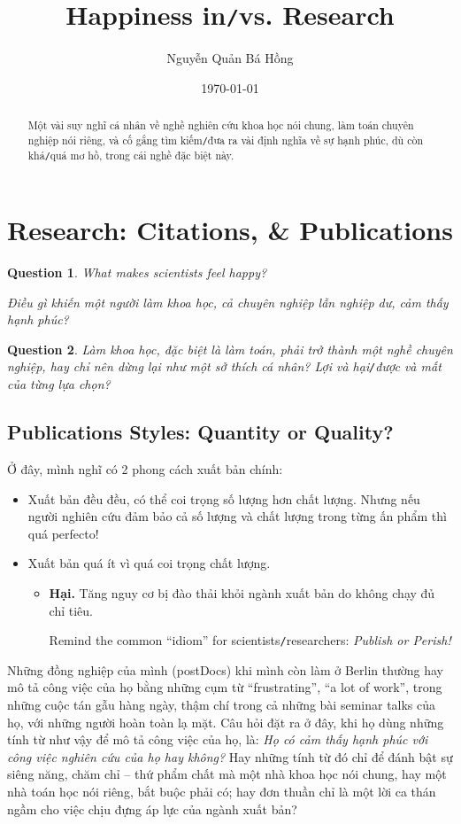 \documentclass{article}
\title{Happiness in\texttt{/}vs. Research}
\author{Nguyễn Quản Bá Hồng}
\date{\today}
\numberwithin{equation}{section}
\newtheorem{ques}{Question}[section]
\begin{document}
\maketitle
\begin{abstract}
	Một vài suy nghĩ cá nhân về nghề nghiên cứu khoa học nói chung, làm toán chuyên nghiệp nói riêng, và cố gắng tìm kiếm\texttt{/}đưa ra vài định nghĩa về sự hạnh phúc, dù còn khá\texttt{/}quá mơ hồ, trong cái nghề đặc biệt này.
\end{abstract}
\tableofcontents


\section{Research: Citations, \& Publications}
\begin{ques}
	What makes scientists feel happy?
	
	Điều gì khiến một người làm khoa học, cả chuyên nghiệp lẫn nghiệp dư, cảm thấy hạnh phúc?
\end{ques}

\begin{ques}
	Làm khoa học, đặc biệt là làm toán, phải trở thành một nghề chuyên nghiệp, hay chỉ nên dừng lại như một sở thích cá nhân? Lợi và hại\texttt{/}được và mất của từng lựa chọn?
\end{ques}

\subsection{Publications Styles: Quantity or Quality?}
Ở đây, mình nghĩ có 2 phong cách xuất bản chính:
\begin{itemize}
	\item Xuất bản đều đều, có thể coi trọng số lượng hơn chất lượng. Nhưng nếu người nghiên cứu đảm bảo cả số lượng và chất lượng trong từng ấn phẩm thì quá perfecto!
	\item Xuất bản quá ít vì quá coi trọng chất lượng.
	\begin{itemize}
		\item \textbf{Hại.} Tăng nguy cơ bị đào thải khỏi ngành xuất bản do không chạy đủ chỉ tiêu.
		
		Remind the common ``idiom'' for scientists\texttt{/}researchers: \textit{Publish or Perish!}
	\end{itemize}
\end{itemize}
Những đồng nghiệp của mình (postDocs) khi mình còn làm ở Berlin thường hay mô tả công việc của họ bằng những cụm từ ``frustrating'', ``a lot of work'', trong những cuộc tán gẫu hàng ngày, thậm chí trong cả những bài seminar talks của họ, với những người hoàn toàn lạ mặt. Câu hỏi đặt ra ở đây, khi họ dùng những tính từ như vậy để mô tả công việc của họ, là: \textit{Họ có cảm thấy hạnh phúc với công việc nghiên cứu của họ hay không?} Hay những tính từ đó chỉ để đánh bật sự siêng năng, chăm chỉ -- thứ phẩm chất mà một nhà khoa học nói chung, hay một nhà toán học nói riêng, bắt buộc phải có; hay đơn thuần chỉ là một lời ca thán ngầm cho việc chịu đựng áp lực của ngành xuất bản?
\end{document}
